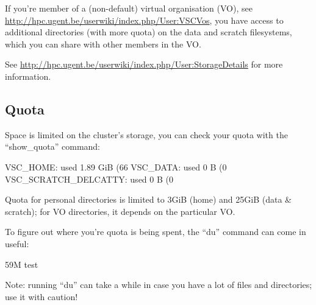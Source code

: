 If you're member of a (non-default) virtual organisation (VO), see
\url{http://hpc.ugent.be/userwiki/index.php/User:VSCVos}, you have access to
additional directories (with more quota) on the data and scratch filesystems,
which you can share with other members in the VO.

See \url{http://hpc.ugent.be/userwiki/index.php/User:StorageDetails} for more
information.

\subsection{Quota}

Space is limited on the cluster's storage, you can check your quota with the
``show\_quota'' command:

\begin{prompt}
VSC_HOME: used 1.89 GiB (66%
VSC_DATA: used 0 B (0%
VSC_SCRATCH_DELCATTY: used 0 B (0%
\end{prompt}

Quota for personal directories is limited to 3GiB (home) and 25GiB (data \&
scratch); for VO directories, it depends on the particular VO.

To figure out where you're quota is being spent, the ``du'' command can come in
useful:

\begin{prompt}
59M   test
\end{prompt}

Note: running ``du'' can take a while in case you have a lot of files and
directories; use it with caution!
